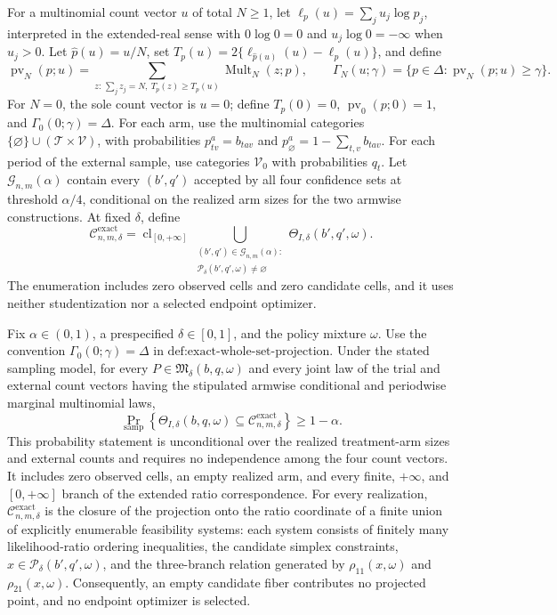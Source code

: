 For a multinomial count vector \(u\) of total \(N\geq 1\), let \(\ell_p(u)=\sum_j u_j\log p_j\), interpreted in the extended-real sense with \(0\log 0=0\) and \(u_j\log 0=-\infty\) when \(u_j>0\). Let \(\widehat p(u)=u/N\), set \(T_p(u)=2\{\ell_{\widehat p(u)}(u)-\ell_p(u)\}\), and define
\[
 \operatorname{pv}_N(p;u)
 =\sum_{z:\,\sum_j z_j=N,\ T_p(z)\geq T_p(u)}
   \operatorname{Mult}_N(z;p),
 \qquad
 \Gamma_N(u;\gamma)=\{p\in\Delta:\operatorname{pv}_N(p;u)\geq\gamma\}.
\]
For \(N=0\), the sole count vector is \(u=0\); define \(T_p(0)=0\), \(\operatorname{pv}_0(p;0)=1\), and \(\Gamma_0(0;\gamma)=\Delta\). For each arm, use the multinomial categories \(\{\varnothing\}\cup(\mathcal T\times\mathcal V)\), with probabilities \(p^a_{tv}=b_{tav}\) and \(p^a_{\varnothing}=1-\sum_{t,v}b_{tav}\). For each period of the external sample, use categories \(\mathcal V_0\) with probabilities \(q_t\). Let \(\mathcal G_{n,m}(\alpha)\) contain every \((b',q')\) accepted by all four confidence sets at threshold \(\alpha/4\), conditional on the realized arm sizes for the two armwise constructions. At fixed \(\delta\), define
\[
 \mathcal C_{n,m,\delta}^{\mathrm{exact}}
 =\operatorname{cl}_{[0,+\infty]}
   \bigcup_{\substack{(b',q')\in\mathcal G_{n,m}(\alpha):\\
                       \mathcal P_\delta(b',q',\omega)\neq\varnothing}}
   \Theta_{I,\delta}(b',q',\omega).
\]
The enumeration includes zero observed cells and zero candidate cells, and it uses neither studentization nor a selected endpoint optimizer.

Fix \(\alpha\in(0,1)\), a prespecified \(\delta\in[0,1]\), and the policy mixture \(\omega\). Use the convention \(\Gamma_0(0;\gamma)=\Delta\) in \(\text{def:exact-whole-set-projection}\). Under the stated sampling model, for every \(P\in\mathfrak M_\delta(b,q,\omega)\) and every joint law of the trial and external count vectors having the stipulated armwise conditional and periodwise marginal multinomial laws,
\[
 \Pr_{\mathrm{samp}}\!\left\{
   \Theta_{I,\delta}(b,q,\omega)
   \subseteq \mathcal C_{n,m,\delta}^{\mathrm{exact}}
 \right\}\geq 1-\alpha .
\]
This probability statement is unconditional over the realized treatment-arm sizes and external counts and requires no independence among the four count vectors. It includes zero observed cells, an empty realized arm, and every finite, \(+\infty\), and \([0,+\infty]\) branch of the extended ratio correspondence. For every realization, \(\mathcal C_{n,m,\delta}^{\mathrm{exact}}\) is the closure of the projection onto the ratio coordinate of a finite union of explicitly enumerable feasibility systems: each system consists of finitely many likelihood-ratio ordering inequalities, the candidate simplex constraints, \(x\in\mathcal P_\delta(b',q',\omega)\), and the three-branch relation generated by \(\rho_{11}(x,\omega)\) and \(\rho_{21}(x,\omega)\). Consequently, an empty candidate fiber contributes no projected point, and no endpoint optimizer is selected.

